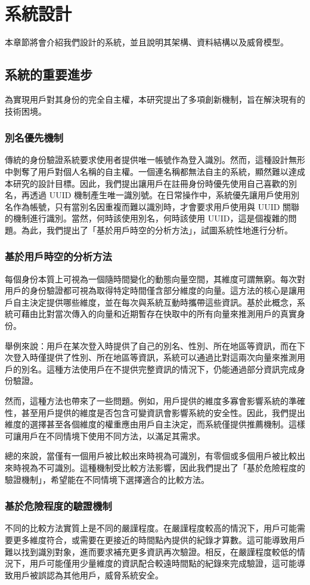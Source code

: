 
\chapter{系統設計}
本章節將會介紹我們設計的系統，並且說明其架構、資料結構以及威脅模型。
\section{系統的重要進步}
為實現用戶對其身份的完全自主權，本研究提出了多項創新機制，旨在解決現有的技術困境。
\subsection{別名優先機制}
傳統的身份驗證系統要求使用者提供唯一帳號作為登入識別。然而，這種設計無形中剝奪了用戶對個人名稱的自主權。一個連名稱都無法自主的系統，顯然難以達成本研究的設計目標。因此，我們提出讓用戶在註冊身份時優先使用自己喜歡的別名，再透過 UUID 機制產生唯一識別號。在日常操作中，系統優先讓用戶使用別名作為帳號，只有當別名因重複而難以識別時，才會要求用戶使用與 UUID 關聯的機制進行識別。當然，何時該使用別名，何時該使用 UUID，這是個複雜的問題。為此，我們提出了「基於用戶時空的分析方法」，試圖系統性地進行分析。
\subsection{基於用戶時空的分析方法}
每個身份本質上可視為一個隨時間變化的動態向量空間，其維度可謂無窮。每次對用戶的身份驗證都可視為取得特定時間僅含部分維度的向量。這方法的核心是讓用戶自主決定提供哪些維度，並在每次與系統互動時攜帶這些資訊。基於此概念，系統可藉由比對當次傳入的向量和近期暫存在快取中的所有向量來推測用戶的真實身份。

舉例來說：用戶在某次登入時提供了自己的別名、性別、所在地區等資訊，而在下次登入時僅提供了性別、所在地區等資訊，系統可以通過比對這兩次向量來推測用戶的別名。這種方法使用戶在不提供完整資訊的情況下，仍能通過部分資訊完成身份驗證。

然而，這種方法也帶來了一些問題。例如，用戶提供的維度多寡會影響系統的準確性，甚至用戶提供的維度是否包含可變資訊會影響系統的安全性。因此，我們提出維度的選擇甚至各個維度的權重應由用戶自主決定，而系統僅提供推薦機制。這樣可讓用戶在不同情境下使用不同方法，以滿足其需求。

總的來說，當僅有一個用戶被比較出來時視為可識別，有零個或多個用戶被比較出來時視為不可識別。這種機制受比較方法影響，因此我們提出了「基於危險程度的驗證機制」，希望能在不同情境下選擇適合的比較方法。
\subsection{基於危險程度的驗證機制}
不同的比較方法實質上是不同的嚴謹程度。在嚴謹程度較高的情況下，用戶可能需要更多維度符合，或需要在更接近的時間點內提供的紀錄才算數。這可能導致用戶難以找到識別對象，進而要求補充更多資訊再次驗證。相反，在嚴謹程度較低的情況下，用戶可能僅用少量維度的資訊配合較遠時間點的紀錄來完成驗證，這可能導致用戶被誤認為其他用戶，威脅系統安全。

